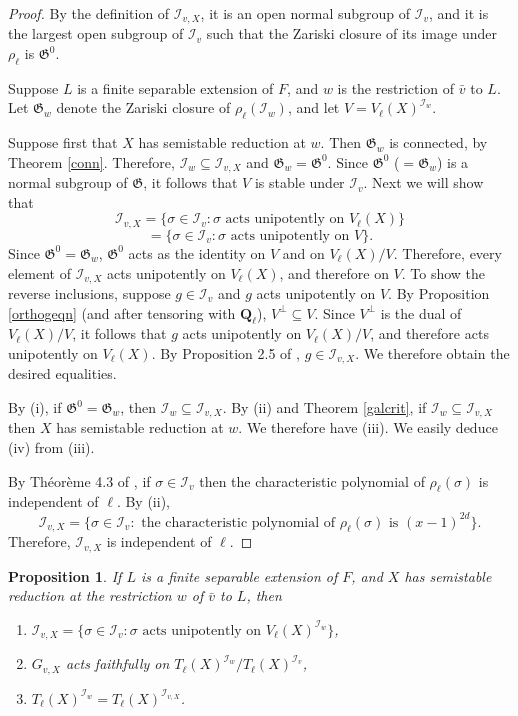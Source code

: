 \documentclass{amsart}
\def\Q{{\mathbf Q}}
\def\W{{V}}
\def\I{{\mathcal I}}
\def\II{{{\mathcal I}_{v,X}}}
\def\r{{\mathfrak G}}
\newtheorem{prop}[thm]{Proposition}
\theoremstyle{definition}
\begin{document}
\begin{proof}
By the definition of $\II$, 
it is an open normal subgroup of $\I_{v}$,
and it is the largest open
subgroup of $\I_{v}$ such that the Zariski closure of its
image under $\rho_{\ell}$ is $\r^{0}$. 

Suppose $L$ is a finite separable extension of $F$, and
$w$ is the restriction of ${\bar v}$ to $L$.
Let $\r_{w}$ denote
the Zariski closure of $\rho_{\ell}(\I_{w})$,
and let $\W = V_{\ell}(X)^{\I_{w}}$.

Suppose first that
$X$ has semistable reduction at $w$.
Then $\r_{w}$ is connected, by Theorem \ref{conn}. 
Therefore, $\I_{w} \subseteq \II$ and
$\r_{w} = \r^{0}$.
Since $\r^{0}$ ($ = \r_{w}$) is a
normal subgroup of $\r$, it follows that $\W$ is stable under
$\I_{v}$.  
Next we will show that 
$$\II = 
\{\sigma \in \I_{v} : 
\sigma \text{ acts unipotently on } V_{\ell}(X) \}$$
$$= 
\{\sigma \in \I_{v} : 
\sigma \text{ acts unipotently on } \W \}.$$
Since $\r^{0} = \r_{w}$,
$\r^{0}$ acts as the identity on $\W$ and on $V_{\ell}(X)/\W$.
Therefore, every element of $\II$ acts unipotently on $V_{\ell}(X)$,
and therefore on $\W$.
To show the reverse inclusions, 
suppose $g \in \I_{v}$ and $g$ acts unipotently on $\W$.
By Proposition \ref{orthogeqn} (and after tensoring with
$\Q_\ell$), 
$\W^{\perp} \subseteq  \W$.
Since $\W^{\perp}$ is the dual of
$V_{\ell}(X)/\W$, it follows that $g$ acts unipotently on
$V_{\ell}(X)/\W$, and therefore acts unipotently on
$V_{\ell}(X)$. By Proposition 2.5 of \cite{Compositio},
$g \in \II$. We therefore obtain the desired equalities.

By (i), if
$\r^{0} = \r_{w}$, then $\I_{w} \subseteq \II$.
By (ii) and Theorem \ref{galcrit}, 
if $\I_{w} \subseteq \II$ then $X$ has semistable
reduction at $w$. We therefore have (iii). 
We easily deduce (iv) from (iii).

By Th\'eor\`eme 4.3 of \cite{SGA},
if $\sigma \in \I_{v}$ then the characteristic polynomial
of $\rho_{\ell}(\sigma)$ is independent of $\ell$.
By (ii), 
$$\II =
\{\sigma \in \I_{v} : \text{ the characteristic polynomial
of } \rho_{\ell}(\sigma) \text{ is } (x-1)^{2d}\}.$$
Therefore, $\II$ is independent of $\ell$.
\end{proof}

\begin{prop}
\label{Wunipot}
If $L$ is a finite separable extension of $F$, and $X$ has
semistable reduction at 
the restriction $w$ of ${\bar v}$ to $L$, then 
\begin{enumerate} 
\item[(i)] $\II = 
\{\sigma \in \I_{v} : 
\sigma \text{ acts unipotently on } V_{\ell}(X)^{\I_{w}} \}$,
\item[(ii)]  $G_{v,X}$ acts faithfully on 
$T_{\ell}(X)^{\I_{w}}/T_{\ell}(X)^{\I_{v}}$,
\item[(iii)]  $T_{\ell}(X)^{\I_{w}} = T_{\ell}(X)^{\II}$.
\end{enumerate} 
\end{prop}
\end{document}
